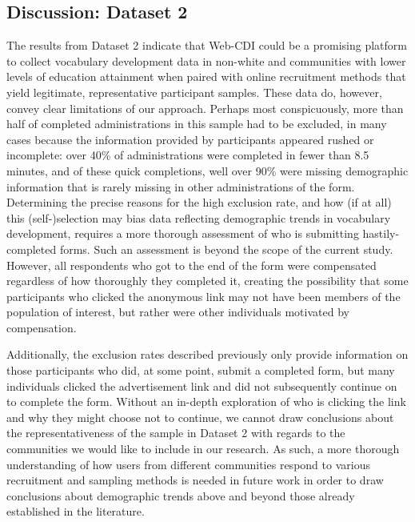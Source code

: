 \documentclass[
  english,
  ,man,floatsintext]{apa6}
\begin{document}
\hypertarget{discussion-dataset-2}{%
\subsection{Discussion: Dataset 2}\label{discussion-dataset-2}}

The results from Dataset 2 indicate that Web-CDI could be a promising platform to collect vocabulary development data in non-white and communities with lower levels of education attainment when paired with online recruitment methods that yield legitimate, representative participant samples. These data do, however, convey clear limitations of our approach. Perhaps most conspicuously, more than half of completed administrations in this sample had to be excluded, in many cases because the information provided by participants appeared rushed or incomplete: over 40\% of administrations were completed in fewer than 8.5 minutes, and of these quick completions, well over 90\% were missing demographic information that is rarely missing in other administrations of the form. Determining the precise reasons for the high exclusion rate, and how (if at all) this (self-)selection may bias data reflecting demographic trends in vocabulary development, requires a more thorough assessment of who is submitting hastily-completed forms. Such an assessment is beyond the scope of the current study. However, all respondents who got to the end of the form were compensated regardless of how thoroughly they completed it, creating the possibility that some participants who clicked the anonymous link may not have been members of the population of interest, but rather were other individuals motivated by compensation.

Additionally, the exclusion rates described previously only provide information on those participants who did, at some point, submit a completed form, but many individuals clicked the advertisement link and did not subsequently continue on to complete the form. Without an in-depth exploration of who is clicking the link and why they might choose not to continue, we cannot draw conclusions about the representativeness of the sample in Dataset 2 with regards to the communities we would like to include in our research. As such, a more thorough understanding of how users from different communities respond to various recruitment and sampling methods is needed in future work in order to draw conclusions about demographic trends above and beyond those already established in the literature.
\end{document}
